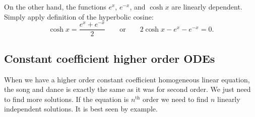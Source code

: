 \begin{example}
On the other hand, the functions $e^x$, $e^{-x}$, and $\cosh x$ are linearly
dependent.  Simply apply definition of the hyperbolic cosine:
\begin{equation*}
\cosh x = \frac{e^x + e^{-x}}{2} 
\qquad
\text{or}
\qquad
2 \cosh x - e^x - e^{-x} = 0.
\end{equation*}
\end{example}

\subsection{Constant coefficient higher order ODEs}

When we have a higher order constant coefficient homogeneous linear
equation, the song and dance is exactly the same as it was for second order.
We just need to find more solutions.  If the equation is
$n^{\text{th}}$ order we need to find $n$ linearly independent solutions.
It is best seen by example.

